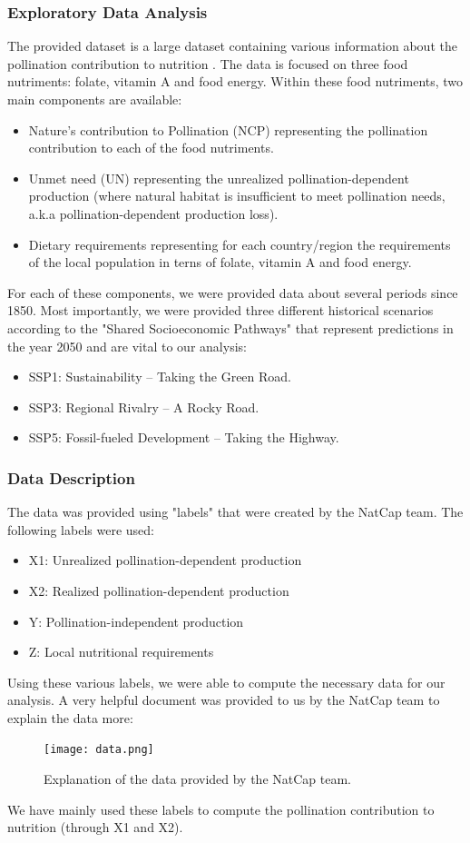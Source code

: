 \documentclass[12pt]{article}
\begin{document}
\subsubsection{Exploratory Data Analysis}

The provided dataset is a large dataset containing various information about the pollination contribution to nutrition . The data is focused on three food nutriments: folate, vitamin A and food energy. Within these food nutriments, two main components are available:
\begin{itemize}
    \item Nature's contribution to Pollination (NCP) representing the pollination contribution to each of the food nutriments.
    \item Unmet need (UN) representing the unrealized pollination-dependent production (where natural habitat is insufficient to meet pollination needs, a.k.a pollination-dependent production loss).
    \item Dietary requirements representing for each country/region the requirements of the local population in terns of folate, vitamin A and food energy.
\end{itemize}
For each of these components, we were provided data about several periods since 1850. Most importantly, we were provided three different historical scenarios according to the "Shared Socioeconomic Pathways" that represent predictions in the year 2050 and are vital to our analysis: 
\begin{itemize}
    \item SSP1: Sustainability – Taking the Green Road.
    \item SSP3: Regional Rivalry – A Rocky Road.
    \item SSP5: Fossil-fueled Development – Taking the Highway.
\end{itemize}

\subsubsection{Data Description}
The data was provided using "labels" that were created by the NatCap team. The following labels were used: 
\begin{itemize}
    \item X1: Unrealized pollination-dependent production
    \item X2: Realized pollination-dependent production
    \item Y: Pollination-independent production
    \item Z: Local nutritional requirements
\end{itemize}
Using these various labels, we were able to compute the necessary data for our analysis. A very helpful document was provided to us by the NatCap team to explain the data more: 
\begin{figure}[htbp]
\centering
\texttt{[image: data.png]}
\caption{Explanation of the data provided by the NatCap team.}
\end{figure} \newline
We have mainly used these labels to compute the pollination contribution to nutrition (through X1 and X2). \newpage
\end{document}
